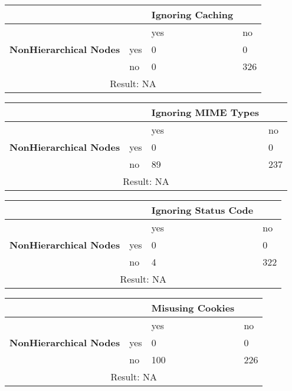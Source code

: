 \documentclass[a4paper,12pt]{article}
\begin{document}
\begin{center}
  \begin{tabular}{| p{60mm} | p{10mm} | p{35mm} | p{35mm} |}
  \hline
   & & \textbf{Ignoring Caching} &
  \\
  \hline
  & & yes & no
  \\
  \hline
  \textbf{NonHierarchical Nodes} & yes & 0 & 0
  \\
  \hline
   & no & 0 & 326
  \\
  \hline
  \multicolumn{4}{|c|}{Result: NA}
  \\ \hline
  \end{tabular}
  \end{center}

\begin{center}
  \begin{tabular}{| p{60mm} | p{10mm} | p{35mm} | p{35mm} |}
  \hline
   & & \textbf{Ignoring MIME Types} &
  \\
  \hline
  & & yes & no
  \\
  \hline
  \textbf{NonHierarchical Nodes} & yes & 0 & 0
  \\
  \hline
   & no & 89 & 237
  \\
  \hline
  \multicolumn{4}{|c|}{Result: NA}
  \\ \hline
  \end{tabular}
  \end{center}

\begin{center}
  \begin{tabular}{| p{60mm} | p{10mm} | p{35mm} | p{35mm} |}
  \hline
   & & \textbf{Ignoring Status Code} &
  \\
  \hline
  & & yes & no
  \\
  \hline
  \textbf{NonHierarchical Nodes} & yes & 0 & 0
  \\
  \hline
   & no & 4 & 322
  \\
  \hline
  \multicolumn{4}{|c|}{Result: NA}
  \\ \hline
  \end{tabular}
  \end{center}

\begin{center}
  \begin{tabular}{| p{60mm} | p{10mm} | p{35mm} | p{35mm} |}
  \hline
   & & \textbf{Misusing Cookies} &
  \\
  \hline
  & & yes & no
  \\
  \hline
  \textbf{NonHierarchical Nodes} & yes & 0 & 0
  \\
  \hline
   & no & 100 & 226
  \\
  \hline
  \multicolumn{4}{|c|}{Result: NA}
  \\ \hline
  \end{tabular}
  \end{center}
\end{document}
